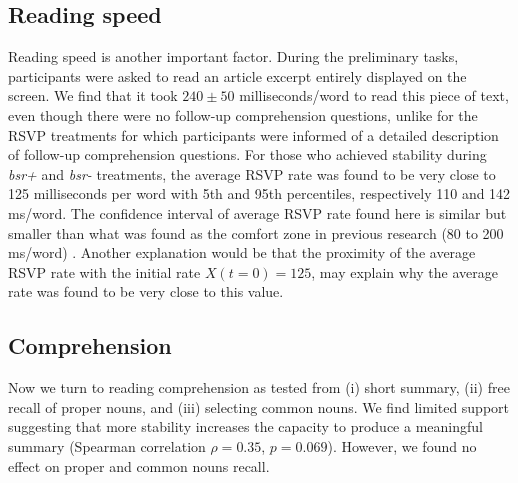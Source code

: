 \subsection{Reading speed}
Reading speed is another important factor. During the preliminary tasks, participants were asked to read an article excerpt entirely displayed on the screen. We find that it took $240\pm50$ milliseconds/word to read this piece of text, even though there were no follow-up comprehension questions, unlike for the RSVP treatments for which participants were informed of a detailed description of follow-up comprehension questions. For those who achieved stability during {\it bsr+} and {\it bsr-} treatments, the average RSVP rate was found to be very close to 125 milliseconds per word with 5th and 95th percentiles, respectively 110  and 142 ms/word. The confidence interval of average RSVP rate found here is similar but smaller than what was found as the comfort zone in previous research (80 to 200 ms/word) \cite{kujala2007phase}. Another explanation would be that the proximity of the average RSVP rate with the initial rate $X(t=0) = 125$, may explain why the average rate was found to be very close to this value. 

\subsection{Comprehension}
Now we turn to reading comprehension as tested from (i) short summary, (ii) free recall of proper nouns, and (iii) selecting common nouns. We find limited support suggesting that more stability increases the capacity to produce a meaningful summary (Spearman correlation $\rho= 0.35$, $p = 0.069$). However, we found no effect on proper and common nouns recall.
